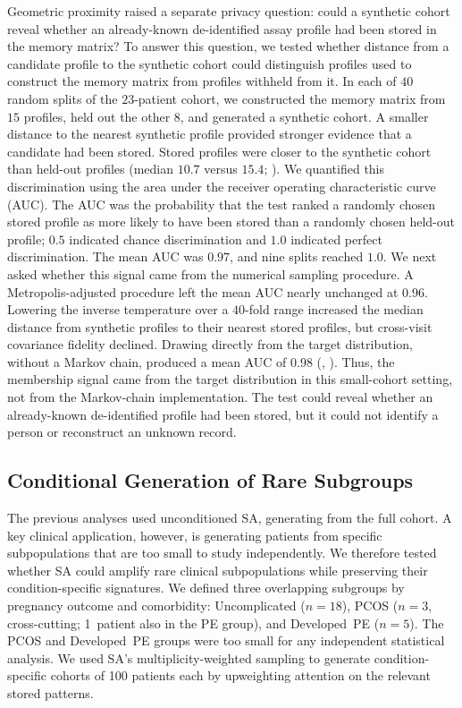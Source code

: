 Geometric proximity raised a separate privacy question: could a synthetic cohort reveal
whether an already-known de-identified assay profile had been stored in the memory matrix?
To answer this question, we tested whether distance from a candidate profile to the synthetic
cohort could distinguish profiles used to construct the memory matrix from profiles withheld
from it. In each of $40$ random splits of the $23$-patient cohort, we constructed the memory
matrix from $15$ profiles, held out the other $8$, and generated a synthetic cohort. A smaller
distance to the nearest synthetic profile provided stronger evidence that a candidate had
been stored. Stored profiles were closer to the synthetic cohort than held-out profiles
(median $10.7$ versus $15.4$; ). We quantified this
discrimination using the area under the receiver operating characteristic curve (AUC). The
AUC was the probability that the test ranked a randomly chosen stored profile as more likely
to have been stored than a randomly chosen held-out profile; $0.5$ indicated chance
discrimination and $1.0$ indicated perfect discrimination. The mean AUC was $0.97$, and nine
splits reached $1.0$. We next asked whether this signal came from the numerical sampling
procedure. A Metropolis-adjusted procedure left the mean AUC nearly unchanged at $0.96$.
Lowering the inverse temperature over a $40$-fold range increased the median distance from
synthetic profiles to their nearest stored profiles, but cross-visit covariance fidelity
declined. Drawing directly from the target distribution, without a Markov chain, produced a
mean AUC of $0.98$ (,
). Thus, the membership signal came from the target
distribution in this small-cohort setting, not from the Markov-chain implementation. The test
could reveal whether an already-known de-identified profile had been stored, but it could not
identify a person or reconstruct an unknown record.

\subsection{Conditional Generation of Rare Subgroups}
\label{sec:results-l3}

The previous analyses used unconditioned SA, generating from the full cohort. A key
clinical application, however, is generating patients from specific subpopulations
that are too small to study independently. We therefore tested whether SA could
amplify rare clinical subpopulations while preserving their
condition-specific signatures. We defined three overlapping subgroups by pregnancy
outcome and comorbidity: Uncomplicated ($n{=}18$), PCOS ($n{=}3$, cross-cutting;
1~patient also in the PE group), and Developed~PE ($n{=}5$). The PCOS and
Developed~PE groups were too small for any independent statistical analysis. We used
SA's multiplicity-weighted sampling to generate condition-specific cohorts of 100
patients each by upweighting attention on the relevant stored patterns.

